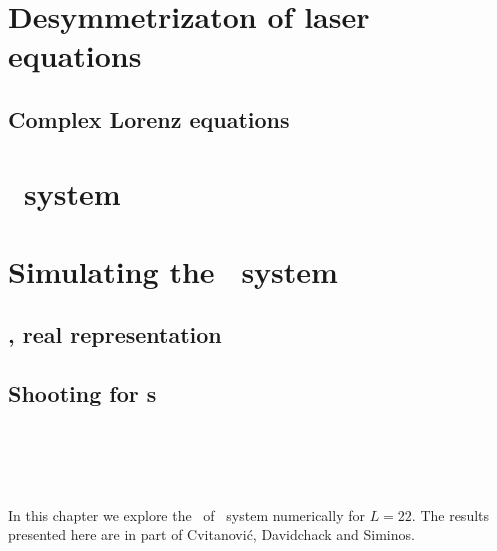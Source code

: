 
\chapter{Desymmetrizaton of laser equations}
\label{chap:lasers}

 \section{Complex Lorenz equations}
    \label{sec:CLe}
    

\chapter{\KS\ system}
\label{chap:KSe}
    \section{\KSe}
    \label{sec:KSe}
    


\chapter{Simulating the \KS\ system}
\label{chap:Numerics}
\section{\KS, real representation}
	
	\section{Shooting for \rpo s}
        
        


\chapter{\KS\ \statesp}
\label{chap:kseStSp}
In this chapter we explore the \statesp\ of \KS\ system numerically for $L=22$.
The results presented here are in
part of Cvitanovi\'c, Davidchack and Siminos.
